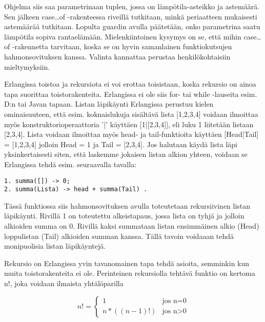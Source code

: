 \documentclass[11pt,oneside,a4paper]{article}
\begin{document}
Ohjelma siis saa parametrinaan tuplen, jossa on lämpötila-asteikko ja astemäärä.
Sen jälkeen case…of -rakenteessa riveillä  tutkitaan, minkä periaatteen
mukaisesti astemäärää tutkitaan. Lopulta guardin avulla päätetään, onko
parametrina saatu lämpötila sopiva rantaelämään. Mielenkiintoinen kysymys on se, että mihin
case…of -rakennetta tarvitaan, koska se on hyvin samanlainen funktiokutsujen
hahmonsovituksen kanssa. Valinta kannattaa perustaa henkilökohtaisiin
mieltymyksiin. 

Erlangissa toistoa ja rekursiota ei voi erottaa toisistaan, koska rekursio on
ainoa tapa suorittaa toistorakenteita. Erlangissa ei ole siis for- tai while
-lauseita esim. D:n tai Javan tapaan. Listan läpikäynti Erlangissa perustuu
kielen ominaisuuteen, että
esim. koknaislukuja sisältävä lista [1,2,3,4]  voidaan ilmoittaa myös
konstruktorioperaattoria '|' käyttäen [1|[2,3,4]], eli luku 1 liitetään listaan
[2,3,4]. Lista voidaan ilmoittaa myös head- ja tail-funktioita käyttäen
[Head|Tail] = [1,2,3,4] jolloin Head = 1 ja Tail = [2,3,4].
Jos halutaan käydä lista läpi yksinkertaisesti siten, että laskemme jokaisen
listan alkion yhteen, voidaan se Erlangissa tehdä esim. seuraavalla tavalla:

\begin{verbatim}
1. summa([]) -> 0;
2. summa(Lista) -> head + summa(Tail) .  
\end{verbatim}


Tässä funktiossa siis hahmonsovituksen avulla toteutetaan rekursiivinen listan
läpikäynti. Rivillä 1 on toteutettu alkeistapaus, jossa lista on tyhjä ja
jolloin alkioiden summa on 0. Rivillä kaksi summataan listan ensimmäinen alkio
(Head) loppulistan 
(Tail) alkioiden summan kanssa. Tällä tavoin voidaaan tehdä monipuolisia listan
läpikäyntejä. 

Rekursio on Erlangissa yvin tavanomainen tapa tehdä asioita, semminkin kun muita
toistorakenteita ei ole. Perinteinen rekursiolla tehtävä funktio on kertoma n!,
joka voidaan ilmaista yhtälöparilla 

\begin{displaymath}
n! = \left\{ \begin{array}{ll}
1 & \textrm{jos n=0}\\
n*((n-1)!) & \textrm{{jos n>0}}
\end{array} \right.
\end{displaymath}
\end{document}
